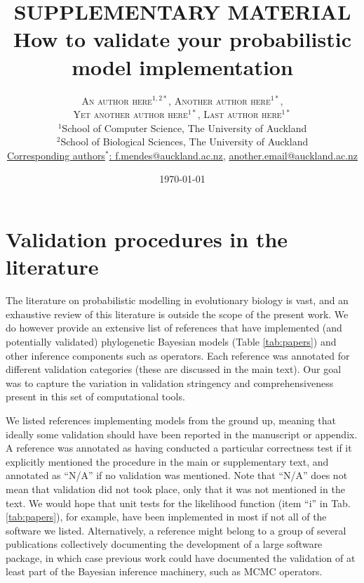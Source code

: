 \documentclass[oneside]{article}
\title{{\huge SUPPLEMENTARY MATERIAL}\\\vspace{.5cm}How to validate your probabilistic model
  implementation} %
\author{\textsc{An author here$^{1,2*}$}, \textsc{Another author
    here$^{1*}$}, \\ \textsc{Yet another author here$^{1*}$},
  \textsc{Last author here$^{1*}$} \\
\small $^1$School of Computer Science, The University of Auckland\\
\small $^2$School of Biological Sciences, The University of Auckland\\
\small
\href{mailto:f.mendes@auckland.ac.nz}{Corresponding authors$^*$: f.mendes@auckland.ac.nz,}
\href{mailto:f.mendes@auckland.ac.nz}{another.email@auckland.ac.nz}
}
\date{\today} %
\begin{document}
\maketitle

\clearpage

\section*{Validation procedures in the literature}

The literature on probabilistic modelling in evolutionary biology is vast,
and an exhaustive review of this literature is outside the
scope of the present work. 
We do however provide an extensive list of references that
have implemented (and potentially validated) phylogenetic Bayesian
models (Table \ref{tab:papers}) and other inference components such as
operators.
Each reference was annotated for different validation categories (these
are discussed in the main text).
Our goal was to capture the variation in validation stringency and
comprehensiveness present in this set of computational tools.

We listed references implementing models from the ground
up, meaning that ideally some validation should have been reported in
the manuscript or appendix.
A reference was annotated as having conducted a particular correctness
test if it explicitly mentioned the procedure in the main or
supplementary text, and annotated as ``N/A'' if no validation was mentioned.
Note that ``N/A'' does not mean that validation did not took place,
only that it was not mentioned in the text.
We would hope that unit tests for the likelihood function (item ``i''
in Tab. \ref{tab:papers}), for example, have been implemented in most
if not all of the software we listed.
Alternatively, a reference might belong to a group of several
publications collectively documenting the development of a large
software package, in which case previous work could have documented 
the validation of at least part of the Bayesian inference machinery,
such as MCMC operators.
\end{document}
